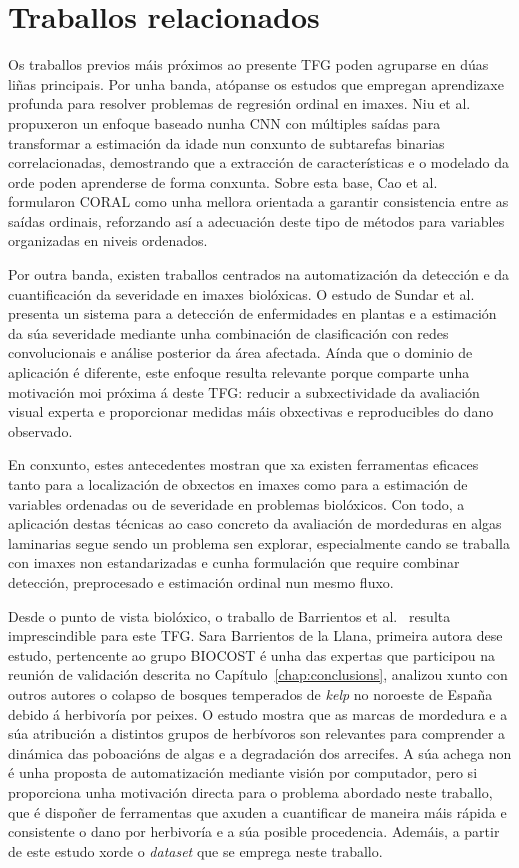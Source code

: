 \section{Traballos relacionados}
Os traballos previos máis próximos ao presente TFG poden agruparse en dúas liñas principais. Por unha
banda, atópanse os estudos que empregan aprendizaxe profunda para resolver problemas de regresión
ordinal en imaxes. Niu et al.~\cite{articuloRegresionOrdinal} propuxeron un enfoque 
baseado nunha CNN con múltiples saídas para transformar a estimación da idade nun conxunto de
subtarefas binarias correlacionadas, demostrando que a extracción de características e o modelado da
orde poden aprenderse de forma conxunta. Sobre esta base, Cao et al.~\cite{articuloCoral}
formularon CORAL como unha mellora orientada a garantir consistencia entre as saídas ordinais,
reforzando así a adecuación deste tipo de métodos para variables organizadas en niveis ordenados.

Por outra banda, existen traballos centrados na automatización da detección e da cuantificación da
severidade en imaxes biolóxicas. O estudo de Sundar et al.~\cite{articuloPlantDisease} presenta un
sistema para a detección de enfermidades en plantas e a estimación da súa severidade mediante unha
combinación de clasificación con redes convolucionais e análise posterior da área afectada. Aínda que
o dominio de aplicación é diferente, este enfoque resulta relevante porque comparte unha motivación moi
próxima á deste TFG: reducir a subxectividade da avaliación visual experta e proporcionar medidas máis
obxectivas e reproducibles do dano observado.

En conxunto, estes antecedentes mostran que xa existen ferramentas eficaces tanto para a localización
de obxectos en imaxes como para a estimación de variables ordenadas ou de severidade en problemas
biolóxicos. Con todo, a aplicación destas técnicas ao caso concreto da avaliación de mordeduras en
algas laminarias segue sendo un problema sen explorar, especialmente cando se traballa con imaxes
non estandarizadas e cunha formulación que require combinar detección, preprocesado e estimación
ordinal nun mesmo fluxo.

Desde o punto de vista biolóxico, o traballo de Barrientos et al.~\cite{articuloBarrientosKelpCollapse}
resulta imprescindible para este TFG. Sara Barrientos de la Llana, primeira autora
dese estudo, pertencente ao grupo BIOCOST é unha das expertas que participou na reunión de validación descrita no
Capítulo~\ref{chap:conclusions}, analizou xunto con outros autores o colapso de bosques temperados
de \textit{kelp} no noroeste de España debido á herbivoría por peixes. O estudo mostra que as marcas
de mordedura e a súa atribución a distintos grupos de herbívoros son relevantes para comprender a
dinámica das poboacións de algas e a degradación dos arrecifes. A súa achega non é unha proposta de
automatización mediante visión por computador, pero si proporciona unha motivación directa para o
problema abordado neste traballo, que é dispoñer de ferramentas que axuden a cuantificar de maneira máis
rápida e consistente o dano por herbivoría e a súa posible procedencia. Ademáis, a partir de este estudo
xorde o \textit{dataset} que se emprega neste traballo.
